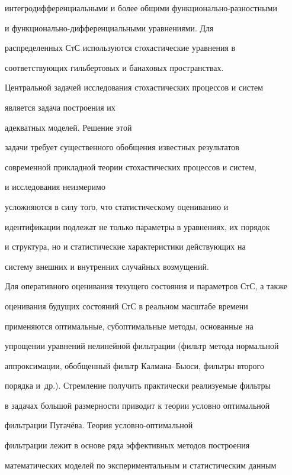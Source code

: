 интегродифференциальными и более общими функ\-ци\-о\-наль\-но-раз\-но\-ст\-ны\-ми


и функ\-ци\-о\-наль\-но-диф\-фе\-рен\-ци\-аль\-ны\-ми уравнениями. Для


распределенных СтС используются стохастические уравнения в


соответствующих гильбертовых и банаховых пространствах.





Центральной задачей исследования стохастических процессов и систем


является задача построения их


адекватных моделей. Решение этой


задачи требует существенного обобщения известных результатов


современной прикладной теории стохастических процессов и систем,


и исследования неизмеримо


усложняются в силу того, что статистическому оцениванию и


идентификации подлежат не только параметры в уравнениях, их порядок


и структура, но и статистические характеристики действующих на


систему внешних и внутренних случайных возмущений.





Для оперативного оценивания текущего состояния и параметров СтС, а также


оценивания будущих состояний СтС в реальном масштабе времени


применяются оптимальные, субоптимальные методы, основанные на


упрощении уравнений нелинейной фильтрации (фильтр метода нормальной


аппроксимации, обобщенный фильтр Кал\-ма\-на--Бью\-си, фильтры второго


порядка и~др.). Стремление получить практически реализуемые фильтры


в задачах большой размерности приводит к теории условно оптимальной


фильтрации Пугачёва. Теория услов\-но-оп\-ти\-маль\-ной


фильтрации лежит в основе ряда эффективных методов по\-стро\-ения


математических моделей по экспериментальным и статистическим данным


